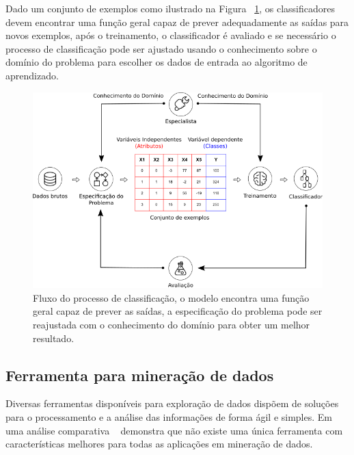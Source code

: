 Dado um conjunto de exemplos como ilustrado na Figura ~\ref{fig:processo_classificacao}, os classificadores devem encontrar uma função geral capaz de prever adequadamente as saídas para novos exemplos, após o treinamento, o classificador é avaliado e se necessário o processo de classificação pode ser ajustado usando o conhecimento sobre o domínio do problema para escolher os dados de entrada ao algoritmo de aprendizado. 


\begin{figure}[H]
\begin{center}
    \includegraphics[scale=0.75]{images/processo_classificacao.png}
\end{center}
\caption{Fluxo do processo de classificação, o modelo encontra uma função geral capaz de prever as saídas, a especificação do problema pode ser reajustada com o conhecimento do domínio para obter um melhor resultado.}
\label{fig:processo_classificacao}
\end{figure}


\subsection{Ferramenta para mineração de dados}

Diversas ferramentas disponíveis para exploração de dados dispõem de soluções para o processamento e a análise das informações de forma ágil e simples. Em uma análise comparativa ~\cite{boscarioli2014avaliaccao} demonstra que não existe uma única ferramenta com características melhores para todas as aplicações em mineração de dados.

